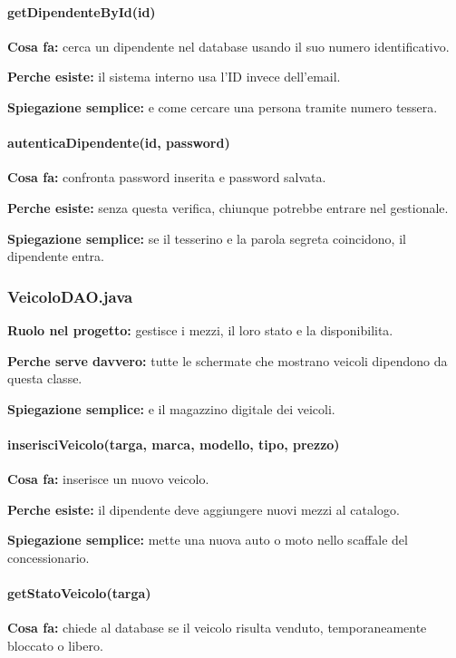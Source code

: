 \documentclass[12pt,a4paper]{article}
\begin{document}
\paragraph{getDipendenteById(id)}
\textbf{Cosa fa:} cerca un dipendente nel database usando il suo numero identificativo.

\textbf{Perche esiste:} il sistema interno usa l'ID invece dell'email.

\textbf{Spiegazione semplice:} e come cercare una persona tramite numero tessera.

\paragraph{autenticaDipendente(id, password)}
\textbf{Cosa fa:} confronta password inserita e password salvata.

\textbf{Perche esiste:} senza questa verifica, chiunque potrebbe entrare nel gestionale.

\textbf{Spiegazione semplice:} se il tesserino e la parola segreta coincidono, il dipendente entra.

\subsubsection*{VeicoloDAO.java}
\textbf{Ruolo nel progetto:} gestisce i mezzi, il loro stato e la disponibilita.

\textbf{Perche serve davvero:} tutte le schermate che mostrano veicoli dipendono da questa classe.

\textbf{Spiegazione semplice:} e il magazzino digitale dei veicoli.

\paragraph{inserisciVeicolo(targa, marca, modello, tipo, prezzo)}
\textbf{Cosa fa:} inserisce un nuovo veicolo.

\textbf{Perche esiste:} il dipendente deve aggiungere nuovi mezzi al catalogo.

\textbf{Spiegazione semplice:} mette una nuova auto o moto nello scaffale del concessionario.

\paragraph{getStatoVeicolo(targa)}
\textbf{Cosa fa:} chiede al database se il veicolo risulta venduto, temporaneamente bloccato o libero.
\end{document}
